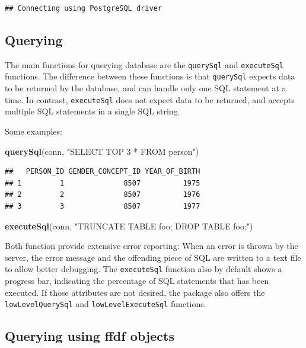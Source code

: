 \documentclass[11pt]{book}
\newenvironment{Shaded}{\begin{snugshade}}{\end{snugshade}}
\newcommand{\KeywordTok}[1]{\textcolor[rgb]{0.13,0.29,0.53}{\textbf{#1}}}
\newcommand{\StringTok}[1]{\textcolor[rgb]{0.31,0.60,0.02}{#1}}
\newcommand{\NormalTok}[1]{#1}
\begin{document}
\begin{verbatim}
## Connecting using PostgreSQL driver
\end{verbatim}

\subsection{Querying}\label{querying}

The main functions for querying database are the \texttt{querySql} and
\texttt{executeSql} functions. The difference between these functions is
that \texttt{querySql} expects data to be returned by the database, and
can handle only one SQL statement at a time. In contrast,
\texttt{executeSql} does not expect data to be returned, and accepts
multiple SQL statements in a single SQL string.

Some examples:

\begin{Shaded}
\begin{Highlighting}[]
\KeywordTok{querySql}\NormalTok{(conn, }\StringTok{"SELECT TOP 3 * FROM person"}\NormalTok{)}
\end{Highlighting}
\end{Shaded}

\begin{verbatim}
##   PERSON_ID GENDER_CONCEPT_ID YEAR_OF_BIRTH
## 1         1              8507          1975
## 2         2              8507          1976
## 3         3              8507          1977
\end{verbatim}

\begin{Shaded}
\begin{Highlighting}[]
\KeywordTok{executeSql}\NormalTok{(conn, }\StringTok{"TRUNCATE TABLE foo; DROP TABLE foo;"}\NormalTok{)}
\end{Highlighting}
\end{Shaded}

Both function provide extensive error reporting: When an error is thrown
by the server, the error message and the offending piece of SQL are
written to a text file to allow better debugging. The
\texttt{executeSql} function also by default shows a progress bar,
indicating the percentage of SQL statements that has been executed. If
those attributes are not desired, the package also offers the
\texttt{lowLevelQuerySql} and \texttt{lowLevelExecuteSql} functions.

\subsection{Querying using ffdf
objects}\label{querying-using-ffdf-objects}
\end{document}
